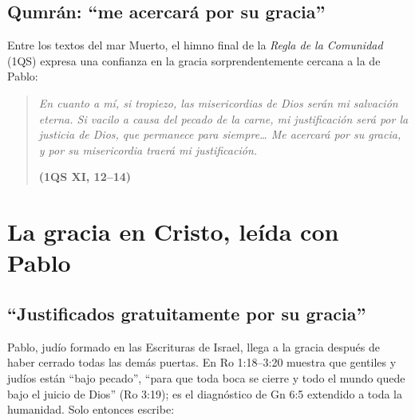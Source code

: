 
\subsection{Qumrán: “me acercará por su gracia”}
Entre los textos del mar Muerto, el himno final de la \emph{Regla de la Comunidad} (1QS) expresa una confianza en la gracia sorprendentemente cercana a la de Pablo:

\begin{quote}\itshape
En cuanto a mí, si tropiezo, las misericordias de Dios serán mi salvación eterna. Si vacilo a causa del pecado de la carne, mi justificación será por la justicia de Dios, que permanece para siempre\ldots{} Me acercará por su gracia, y por su misericordia traerá mi justificación.\par\hfill{\upshape\small\bfseries\textcolor{azulp}{(1QS XI, 12--14)}}
\end{quote}


\section{La gracia en Cristo, leída con Pablo}

\subsection{“Justificados gratuitamente por su gracia”}
Pablo, judío formado en las Escrituras de Israel, llega a la gracia después de haber cerrado todas las demás puertas. En Ro 1:18--3:20 muestra que gentiles y judíos están ``bajo pecado'', ``para que toda boca se cierre y todo el mundo quede bajo el juicio de Dios'' (Ro 3:19); es el diagnóstico de Gn 6:5 extendido a toda la humanidad. Solo entonces escribe:

